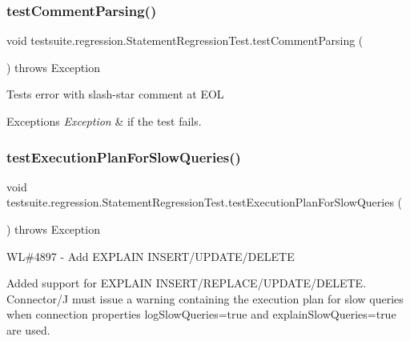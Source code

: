 \subsubsection{\texorpdfstring{test\+Comment\+Parsing()}{testCommentParsing()}}
{\footnotesize\ttfamily void testsuite.\+regression.\+Statement\+Regression\+Test.\+test\+Comment\+Parsing (\begin{DoxyParamCaption}{ }\end{DoxyParamCaption}) throws Exception}

Tests error with slash-\/star comment at E\+OL


\begin{DoxyExceptions}{Exceptions}
{\em Exception} & if the test fails. \\
\hline
\end{DoxyExceptions}
\mbox{\label{classtestsuite_1_1regression_1_1_statement_regression_test_a48e3f759b34396e94ab7bf59872d5604}} 
\subsubsection{\texorpdfstring{test\+Execution\+Plan\+For\+Slow\+Queries()}{testExecutionPlanForSlowQueries()}}
{\footnotesize\ttfamily void testsuite.\+regression.\+Statement\+Regression\+Test.\+test\+Execution\+Plan\+For\+Slow\+Queries (\begin{DoxyParamCaption}{ }\end{DoxyParamCaption}) throws Exception}

WL\#4897 -\/ Add E\+X\+P\+L\+A\+IN I\+N\+S\+E\+R\+T/\+U\+P\+D\+A\+T\+E/\+D\+E\+L\+E\+TE

Added support for E\+X\+P\+L\+A\+IN I\+N\+S\+E\+R\+T/\+R\+E\+P\+L\+A\+C\+E/\+U\+P\+D\+A\+T\+E/\+D\+E\+L\+E\+TE. Connector/J must issue a warning containing the execution plan for slow queries when connection properties log\+Slow\+Queries=true and explain\+Slow\+Queries=true are used.


